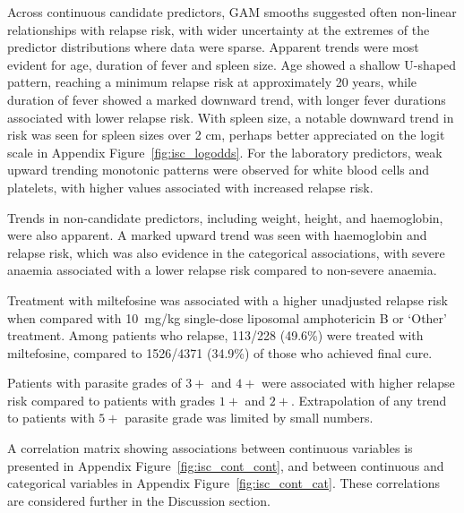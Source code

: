 Across continuous candidate predictors, GAM smooths suggested often non-linear relationships with relapse risk, with wider uncertainty at the extremes of the predictor distributions where data were sparse. Apparent trends were most evident for age, duration of fever and spleen size. Age showed a shallow U-shaped pattern, reaching a minimum relapse risk at approximately 20 years, while duration of fever showed a marked downward trend, with longer fever durations associated with lower relapse risk. With spleen size, a notable downward trend in risk was seen for spleen sizes over 2 cm, perhaps better appreciated on the logit scale in Appendix Figure~\ref{fig:isc_logodds}. For the laboratory predictors, weak upward trending monotonic patterns were observed for white blood cells and platelets, with higher values associated with increased relapse risk.

Trends in non-candidate predictors, including weight, height, and haemoglobin, were also apparent. A marked upward trend was seen with haemoglobin and relapse risk, which was also evidence in the categorical associations, with severe anaemia associated with a lower relapse risk compared to non-severe anaemia.

Treatment with miltefosine was associated with a higher unadjusted relapse risk when compared with 10~mg/kg single-dose liposomal amphotericin B or `Other' treatment. Among patients who relapse, 113/228 (49.6\%) were treated with miltefosine, compared to 1526/4371 (34.9\%) of those who achieved final cure.

Patients with parasite grades of $3+$ and $4+$ were associated with higher relapse risk compared to patients with grades $1+$ and $2+$. Extrapolation of any trend to patients with $5+$ parasite grade was limited by small numbers.

A correlation matrix showing associations between continuous variables is presented in Appendix Figure~\ref{fig:isc_cont_cont}, and between continuous and categorical variables in Appendix Figure~\ref{fig:isc_cont_cat}. These correlations are considered further in the Discussion section.


